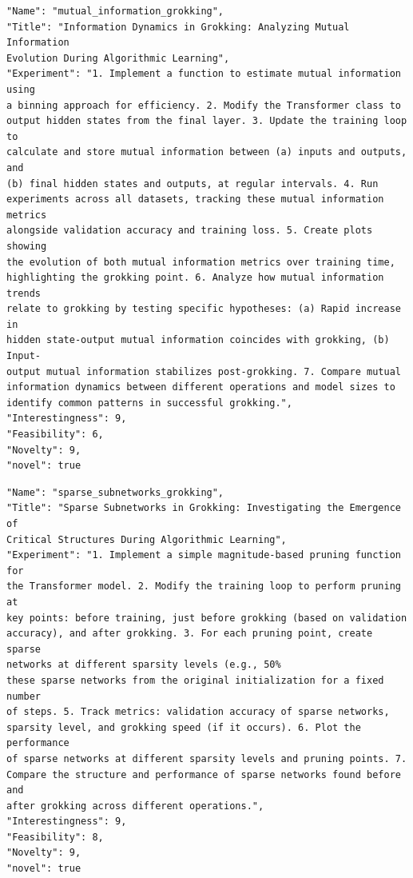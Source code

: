\documentclass[11pt, a4paper]{include/gdm_format}
\begin{document}
\begin{tcolorbox}[breakable,colback=blue!5!white, colframe=blue!75!black, title=Idea 15/50 - \texttt{mutual\_information\_grokking}]
\small
\begin{verbatim}
"Name": "mutual_information_grokking",
"Title": "Information Dynamics in Grokking: Analyzing Mutual Information
Evolution During Algorithmic Learning",
"Experiment": "1. Implement a function to estimate mutual information using
a binning approach for efficiency. 2. Modify the Transformer class to
output hidden states from the final layer. 3. Update the training loop to
calculate and store mutual information between (a) inputs and outputs, and
(b) final hidden states and outputs, at regular intervals. 4. Run
experiments across all datasets, tracking these mutual information metrics
alongside validation accuracy and training loss. 5. Create plots showing
the evolution of both mutual information metrics over training time,
highlighting the grokking point. 6. Analyze how mutual information trends
relate to grokking by testing specific hypotheses: (a) Rapid increase in
hidden state-output mutual information coincides with grokking, (b) Input-
output mutual information stabilizes post-grokking. 7. Compare mutual
information dynamics between different operations and model sizes to
identify common patterns in successful grokking.",
"Interestingness": 9,
"Feasibility": 6,
"Novelty": 9,
"novel": true
\end{verbatim}
\end{tcolorbox}

\begin{tcolorbox}[breakable,colback=blue!5!white, colframe=blue!75!black, title=Idea 16/50 - \texttt{sparse\_subnetworks\_grokking}]
\small
\begin{verbatim}
"Name": "sparse_subnetworks_grokking",
"Title": "Sparse Subnetworks in Grokking: Investigating the Emergence of
Critical Structures During Algorithmic Learning",
"Experiment": "1. Implement a simple magnitude-based pruning function for
the Transformer model. 2. Modify the training loop to perform pruning at
key points: before training, just before grokking (based on validation
accuracy), and after grokking. 3. For each pruning point, create sparse
networks at different sparsity levels (e.g., 50%
these sparse networks from the original initialization for a fixed number
of steps. 5. Track metrics: validation accuracy of sparse networks,
sparsity level, and grokking speed (if it occurs). 6. Plot the performance
of sparse networks at different sparsity levels and pruning points. 7.
Compare the structure and performance of sparse networks found before and
after grokking across different operations.",
"Interestingness": 9,
"Feasibility": 8,
"Novelty": 9,
"novel": true
\end{verbatim}
\end{tcolorbox}
\end{document}
